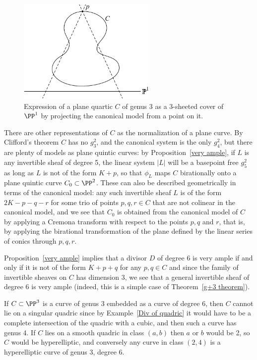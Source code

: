 \begin{figure}
\centerline {\includegraphics[height=2in]{"main/Fig05-3"}}
 \caption{Expression of a plane quartic $C$ of genus 3 as a 3-sheeted cover of $\PP^1$ by projecting the canonical model from a point on it.}
\end{figure}


There are other representations of $C$ as the normalization of a plane curve. By Clifford's theorem $C$ has no $g^2_3$, and the canonical system is the only $g^2_4$, but there are plenty of models as plane quintic curves: by Proposition~\ref{very ample}, if $L$ is any invertible sheaf of degree 5, the linear system $|L|$ will be a basepoint free $g^2_5$ as long as $L$ is not of the form $K+p$, so that $\phi_L$ maps $C$ birationally onto a plane quintic curve $C_0 \subset \PP^2$. These can also be described geometrically in terms of the canonical model: any such invertible sheaf $L$ is of the form $2K-p-q-r$ for some trio of  points $p, q, r \in C$ that are not colinear in the canonical model, and we see  that $C_0$ is obtained from the canonical model of $C$ by applying a Cremona transform with respect to the points $p, q$ and $r$, that is, by applying the birational transformation
of the plane defined by the linear series of conics through $p,q,r$.

Proposition~\ref{very ample} implies that a divisor $D$ of degree 6 is very ample if and only if it is not of the form $K+p+q$ for any $p, q \in C$ and since the family of invertible sheaves on $C$ has dimension 3,  we see that a general invertible sheaf of degree 6 is very ample (indeed, this is a simple case of Theorem~\ref{g+3 theorem}).  

If $C\subset \PP^3$ is a curve of genus 3 embedded as a curve of degree 6, then $C$ cannot lie on a singular quadric since by Example~\ref{Div of quadric} it would
have to be a complete intersection of the quadric with a cubic, and then such a curve has genus 4. If $C$ lies on a smooth quadric
in class $(a,b)$ then $a$ or $b$ would be 2, so $C$ would be hyperelliptic, and conversely any curve in class $(2,4)$ 
is a hyperelliptic curve of genus 3, degree 6. 


